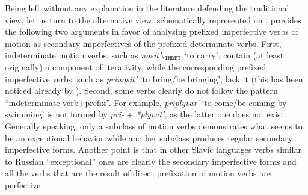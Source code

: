
Being left without any explanation in the literature defending the traditional view, let us turn to the alternative view, schematically represented on . \citet{Regnell:44} provides the following two arguments in favor of analysing prefixed imperfective verbs of motion as secondary imperfectives of the prefixed determinate verbs. First, indeterminate motion verbs, such as \textit{nosit'}$_{\INDET}$ `to carry', contain (at least originally) a component of iterativity, while the corresponding prefixed imperfective verbs, such as \textit{prinosit'} `to bring/be bringing', lack it (this has been noticed already by \citealt{Mazon:1928}). Second, some verbs clearly do not follow the pattern ``indeterminate verb+prefix''. For example, \textit{priplyvat'} `to come/be coming by swimming' is not formed by \textit{pri-} + \textit{*plyvat'}, as the latter one does not exist. Generally speaking, only a subclass of motion verbs demonstrates what seems to be an exceptional behavior while another subclass produces regular secondary imperfective forms. Another point is that in other Slavic languages verbs similar to Russian ``exceptional'' ones are clearly the secondary imperfective forms and all the verbs that are the result of direct prefixation of motion verbs are perfective.

